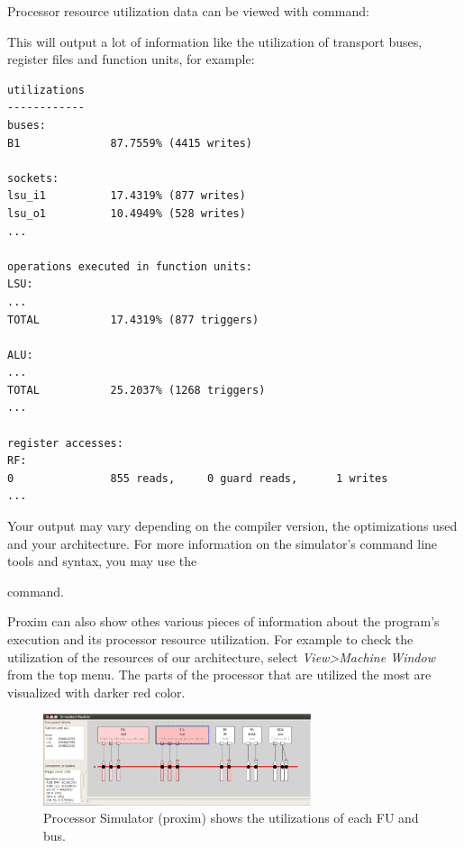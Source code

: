 \documentclass[twoside]{tceusermanual}
\begin{document}
Processor resource utilization data can be viewed with command:


This will output a lot of information like the utilization of transport buses,
register files and function units, for example: 

\begin{verbatim}
utilizations
------------
buses:
B1              87.7559% (4415 writes)

sockets:
lsu_i1          17.4319% (877 writes)
lsu_o1          10.4949% (528 writes)
...

operations executed in function units:
LSU:
...
TOTAL           17.4319% (877 triggers)

ALU:
...
TOTAL           25.2037% (1268 triggers)
...

register accesses:
RF:
0               855 reads,     0 guard reads,      1 writes       
...

\end{verbatim}

Your output may vary depending on the compiler version, the optimizations
used and your architecture. For more information on the simulator's command 
line tools and syntax, you may use the 


command.

Proxim can also show othes various pieces of information about the
program's execution and its processor resource utilization. For
example to check the utilization of the resources of our architecture,
select \textit{View>Machine Window} from the top menu. The parts of
the processor that are utilized the most are visualized with darker
red color.

\begin{figure}
  \begin{center}
    \includegraphics[width=0.7\textwidth]{eps/proxim_util.eps}
    \caption{Processor Simulator (proxim) shows the utilizations of each FU and bus.}
    \label{fig:proxim_util}
  \end{center}
\end{figure}
\end{document}
